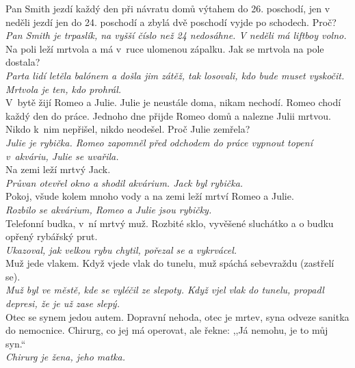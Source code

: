 \begin{multicols}{\value{columnsgames}}
\noindent
Pan Smith jezdí každý den při návratu domů výtahem do 26. 
poschodí, jen v neděli jezdí jen do 24. poschodí a zbylá dvě 
poschodí vyjde po schodech. Proč?\\[1 mm]
{\sl Pan Smith je trpaslík, na vyšší číslo než 24 nedosáhne. V 
neděli má liftboy volno.}\\

\noindent
Na poli leží mrtvola a má v~ruce ulomenou zápalku. Jak se mrtvola
na pole dostala?\\[1 mm]
{\sl Parta lidí letěla balónem a došla jim zátěž, tak losovali, 
kdo bude muset vyskočit. Mrtvola je ten, kdo prohrál.}\\

\noindent
V~bytě žijí Romeo a Julie. Julie je neustále doma, 
nikam nechodí. Romeo chodí každý den do práce. Jednoho dne přijde 
Romeo domů a nalezne Julii mrtvou. Nikdo k~nim nepřišel, 
nikdo neodešel. Proč Julie zemřela?\\[1 mm]
{\sl Julie je rybička. Romeo zapomněl před odchodem do práce vypnout 
topení v~akváriu, Julie se uvařila.}\\

\noindent
Na zemi leží mrtvý Jack.\\[1 mm]
{\sl Průvan otevřel okno a shodil akvárium. Jack byl rybička.}\\

\noindent
Pokoj, všude kolem mnoho vody a na zemi leží mrtví 
Romeo a Julie.\\[1 mm]
{\sl Rozbilo se akvárium, Romeo a Julie jsou rybičky.}\\

\noindent
Telefonní budka, v~ní mrtvý muž. Rozbité sklo, 
vyvěšené sluchátko a o budku opřený rybářský prut.\\[1 mm]
{\sl Ukazoval, jak velkou rybu chytil, pořezal se a vykrvácel.}\\

\noindent
Muž jede vlakem. Když vjede vlak do tunelu, muž 
spáchá sebevraždu (zastřelí se).\\[1 mm]
{\sl Muž byl ve městě, kde se vyléčil ze slepoty. Když vjel vlak 
do tunelu, propadl depresi, že je už zase slepý.}\\

\noindent
Otec se synem jedou autem. Dopravní nehoda, otec je mrtev, 
syna odveze sanitka do nemocnice. Chirurg, co jej má operovat, 
ale řekne: ,,Já nemohu, je to můj syn.``\\[1 mm]
{\sl Chirurg je žena, jeho matka.}\\


\end{multicols}
